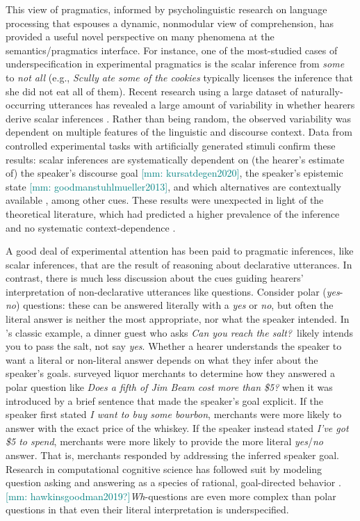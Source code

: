 \documentclass[12pt,letterpaper,table,svgnames,dvipsnames]{article}
\newcommand{\mm}[1]{\textcolor{teal}{[mm: #1]}}
\begin{document}
This view of pragmatics, informed by psycholinguistic research on language processing that espouses a dynamic, nonmodular view of comprehension, has provided a useful novel perspective on many phenomena at the semantics/pragmatics interface. For instance, one of the most-studied cases of underspecification in experimental pragmatics is the scalar inference from \emph{some} to \emph{not all} (e.g., \emph{Scully ate some of the cookies} typically licenses the inference that she did not eat all of them). Recent research using a large dataset of naturally-occurring utterances has revealed a large amount of variability in whether hearers derive scalar inferences \cite{degen2015}. Rather than being random, the observed variability was dependent on multiple features of the linguistic and discourse context. Data from controlled experimental tasks with artificially generated stimuli confirm these results: scalar inferences are systematically dependent on (the hearer's estimate of) the speaker's discourse goal \cite{zondervan2010}\mm{kursatdegen2020}, the speaker's epistemic state \mm{goodmanstuhlmueller2013}\cite{brehenyetal2013}, and which alternatives are contextually available \cite{huangsnedeker2011,degentanenhaus2016}, among other cues. These results were unexpected in light of the theoretical literature, which had predicted a higher prevalence of the inference and no systematic context-dependence \cite{levinson2000}.

A good deal of experimental attention has been paid to pragmatic inferences, like scalar inferences, that are the result of reasoning about declarative utterances. In contrast, there is much less discussion about the cues guiding hearers' interpretation of non-declarative utterances like questions. Consider polar (\emph{yes}-\emph{no}) questions: these can be answered literally with a \emph{yes} or \emph{no}, but often the literal answer is neither the most appropriate, nor what the speaker intended. In 's classic example, a dinner guest who asks \emph{Can you reach the salt?}~likely intends you to pass the salt, not say \emph{yes}. Whether a hearer understands the speaker to want a literal or non-literal answer depends on what they infer about the speaker's goals.  surveyed liquor merchants to determine how they answered a polar question like \emph{Does a fifth of Jim Beam cost more than \$5?} when it was introduced by a brief sentence that made the speaker's goal explicit. If the speaker first stated \emph{I want to buy some bourbon}, merchants were more likely to answer with the exact price of the whiskey. If the speaker instead stated \emph{I've got \$5 to spend}, merchants were more likely to provide the more literal \emph{yes}/\emph{no} answer. That is, merchants responded by addressing the inferred speaker goal. Research in computational cognitive science has followed suit by modeling question asking and answering as a species of rational, goal-directed behavior \cite{hawkinsetal2015,rotheetal2018}. \mm{hawkinsgoodman2019?}\emph{Wh}-questions are even more complex than polar questions in that even their literal interpretation is underspecified. 






\setlength{\bibleftmargin}{.125in}
\setlength{\bibindent}{-\bibleftmargin}


\end{document}
